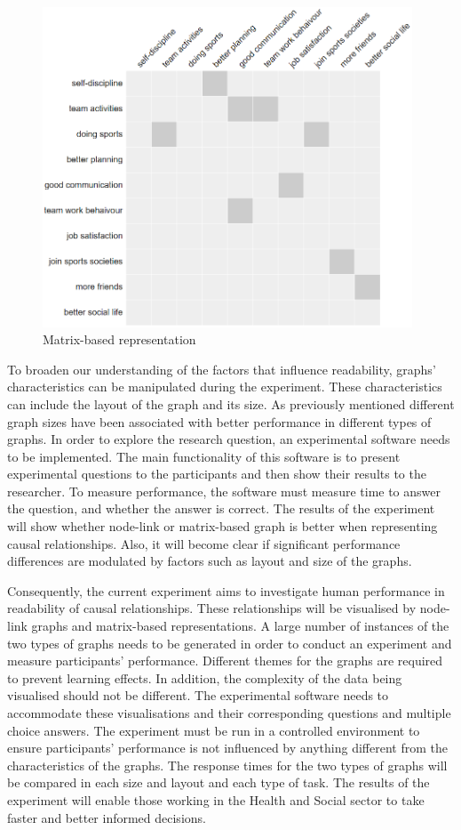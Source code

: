 \documentclass{l4proj}
\begin{document}
\begin{figure}[H]
\centering
\includegraphics[width=11cm]{images/gymSmallAlpha.PNG}
\caption{Matrix-based representation}
\label{gymSmallAlphaintro}
\end{figure}
 
To broaden our understanding of the factors that influence readability, graphs' characteristics can be manipulated during the experiment. These characteristics can include the layout of the graph and its size. As previously mentioned different graph sizes have been associated with better performance in different types of graphs. In order to explore the research question, an experimental software needs to be implemented. The main functionality of this software  is to present experimental questions to the participants and then show their results to the researcher. To measure performance, the software must measure time to answer the question, and whether the answer is correct. The results of the experiment will show whether node-link or matrix-based graph is better when representing causal relationships. Also, it will become clear if significant performance differences are modulated by factors such as layout and size of the graphs. 

Consequently, the current experiment aims to investigate human performance in readability of causal relationships. These relationships will be visualised by node-link graphs and matrix-based representations. A large number of instances of the two types of graphs needs to be generated in order to conduct an experiment and measure participants' performance. Different themes for the graphs are required to prevent learning effects. In addition, the complexity of the data being visualised should not be different. The experimental software needs to accommodate these visualisations and their corresponding questions and multiple choice answers. The experiment must be run in a controlled environment to ensure participants' performance is not influenced by anything different from the characteristics of the graphs. The response times for the two types of graphs will be compared in each size and layout and each type of task. The results of the experiment will enable those working in the Health and Social sector to take faster and better informed decisions. 
\end{document}
